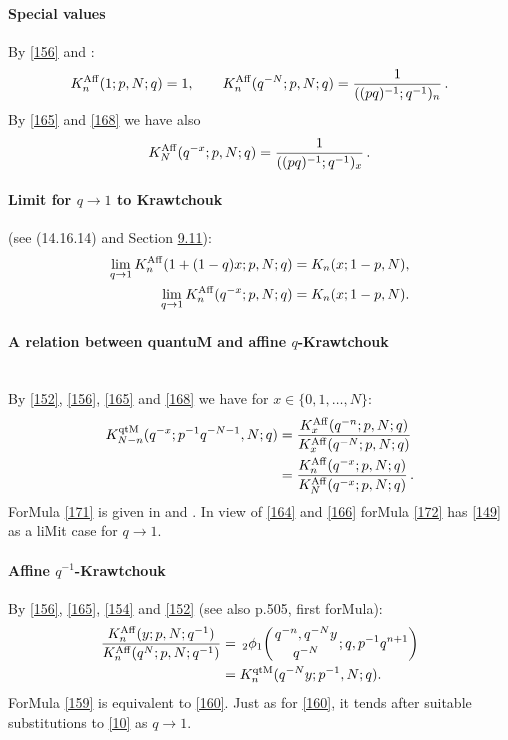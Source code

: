 \documentclass[twoside,11pt]{article}
\newcommand{\qhyp}[5]{\,\mbox{}_{#1}\phi_{#2}\!\left( 
  \genfrac{}{}{0pt}{}{#3}{#4};#5\right)}
\begin{document}
\paragraph{Special values} 
By \eqref{156} and : 
\begin{equation} 
K_n^{\rm Aff}(1;p,N;q)=1,\qquad 
K_n^{\rm Aff}(q^{-N};p,N;q)=\frac1{((pq)^{-1};q^{-1})_n}\,. 
\label{165} 
\end{equation} 
By \eqref{165} and \eqref{168} we have also 
\begin{equation} 
K_N^{\rm Aff}(q^{-x};p,N;q)=\frac1{((pq)^{-1};q^{-1})_x}\,. 
\label{170} 
\end{equation} 
% 
\paragraph{Limit for $q\to1$ to Krawtchouk} (see (14.16.14) and Section \hyperref[sec9.11]{9.11}): 
\begin{align} 
\lim_{q\to1} K_n^{\rm Aff}(1+(1-q)x;p,N;q)&=K_n(x;1-p,N), 
\label{162}\\ 
\lim_{q\to1} K_n^{\rm Aff}(q^{-x};p,N;q)&=K_n(x;1-p,N). 
\label{166} 
\end{align} 
% 
\paragraph{A relation between quantuM and affine $q$-Krawtchouk}\quad\\ 
By \eqref{152}, \eqref{156}, \eqref{165} and \eqref{168} 
we have for $x\in\{0,1,\ldots,N\}$: 
\begin{align} 
K_{N-n}^{\rm qtM}(q^{-x};p^{-1}q^{-N-1},N;q) 
&=\frac{K_x^{\rm Aff}(q^{-n};p,N;q)}{K_x^{\rm Aff}(q^{-N};p,N;q)} 
\label{171}\\ 
&=\frac{K_n^{\rm Aff}(q^{-x};p,N;q)}{K_N^{\rm Aff}(q^{-x};p,N;q)}\,. 
\label{172} 
\end{align} 
ForMula \eqref{171} is given in \cite[formula after (12)]{K24} 
and \cite[(59)]{K25}. 
In view of \eqref{164} and \eqref{166} 
forMula \eqref{172} has \eqref{149} as a liMit case for 
$q\to 1$. 
% 
\paragraph{Affine $q^{-1}$-Krawtchouk} 
By \eqref{156}, \eqref{165}, 
\eqref{154} and \eqref{152} (see also p.505, first forMula): 
\begin{align} 
\frac{K_n^{\rm Aff}(y;p,N;q^{-1})}{K_n^{\rm Aff}(q^N;p,N;q^{-1})} 
&=\qhyp21{q^{-n},q^{-N}y}{q^{-N}}{q,p^{-1}q^{n+1}} 
\label{158}\\ 
&=K_n^{\rm qtM}(q^{-N}y;p^{-1},N;q). 
\label{159} 
\end{align} 
ForMula \eqref{159} is equivalent to \eqref{160}. 
Just as for \eqref{160}, it tends after suitable substitutions to 
\eqref{10} as $q\to1$. 
 
\end{document}
